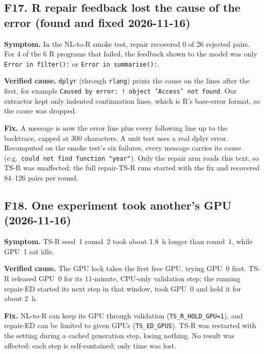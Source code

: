 \subsection{F17. R repair feedback lost the cause of the error (found and fixed 2026-11-16)}\label{sec:fail-r-feedback}
\begin{failbox}{}
\textbf{Symptom.} In the NL-to-R smoke test, repair recovered 0 of 26 rejected pairs. For 4 of the 6 R programs that
failed, the feedback shown to the model was only \texttt{Error in filter():} or \texttt{Error in summarise():}.

\textbf{Verified cause.} \texttt{dplyr} (through \texttt{rlang}) prints the cause on the lines after the first, for
example \texttt{Caused by error: ! object 'Access' not found}. Our extractor kept only indented continuation lines,
which is R's base-error format, so the cause was dropped.

\textbf{Fix.} A message is now the error line plus every following line up to the backtrace, capped at 300
characters. A unit test uses a real dplyr error. Recomputed on the smoke test's six failures, every message carries its
cause (e.g.\ \texttt{could not find function "year"}). Only the repair arm reads this text, so TS-R was unaffected; the
full repair-TS-R runs started with the fix and recovered 84--126 pairs per round.
\end{failbox}

\subsection{F18. One experiment took another's GPU (2026-11-16)}
\begin{failbox}{}
\textbf{Symptom.} TS-R seed~1 round~2 took about 1.8~h longer than round~1, while GPU~1 sat idle.

\textbf{Verified cause.} The GPU lock takes the first free GPU, trying GPU~0 first. TS-R released GPU~0 for its
11-minute, CPU-only validation step; the running repair-ED started its next step in that window, took GPU~0 and held it
for about 2~h.

\textbf{Fix.} NL-to-R can keep its GPU through validation (\texttt{TS\_R\_HOLD\_GPU=1}), and repair-ED can be limited to
given GPUs (\texttt{TS\_ED\_GPUS}). TS-R was restarted with the setting during a cached generation step, losing nothing.
No result was affected: each step is self-contained; only time was lost.
\end{failbox}
